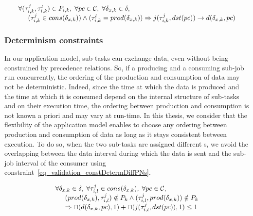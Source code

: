 \documentclass[main.tex]{subfiles}
\begin{document}
\begin{equation}
    \label{eq_validation_constBwDataPrec}
    \begin{array}{l}
        \forall (\tau_{i,k}^j , \tau_{i,k}^l) \in P_{i,k}, \; \forall pc \in \mathcal{C} , \; \forall \delta_{x,k} \in \delta , \;  \\
        \hspace{5mm} (\tau_{i,k}^j \in cons(\delta_{x,k})) \land (\tau_{i,k}^l = prod(\delta_{x,k}))
        \Rightarrow j(\tau_{i,k}^j , dst(pc)) \to d( \delta_{x,k} , pc )  
    \end{array}
\end{equation}


\subsubsection{Determinism constraints}
In our application model, sub-tasks can exchange data, even without being
constrained by precedence relations. So, if a producing and a consuming sub-job
run concurrently, the ordering of the production and consumption of data may
not be deterministic. Indeed, since the time at which the data is produced and
the time at which it is consumed depend on the internal structure of sub-tasks
and on their execution time, the ordering between production and consumption is
not known a priori and may vary at run-time. In this thesis, we consider that
the flexibility of the application model enables to choose any ordering between
production and consumption of data as long as it stays consistent between
execution. To do so, when the two sub-tasks are assigned different \PN{}s, we
avoid the overlapping between the data interval during which the data is sent
and the sub-job interval of the consumer using
constraint~\ref{eq_validation_constDetermDiffPNs}.

\begin{equation}
    \label{eq_validation_constDetermDiffPNs}
    \begin{array}{l}
        \forall \delta_{x,k} \in \delta ,\; \forall \tau_{i,l}^j \in cons( \delta_{x,k} ), \; \forall pc \in \mathcal{C}, \\
        \hspace{5mm} ( prod(\delta_{x,k}), \tau_{i,l}^j ) \notin P_k \land (\tau_{i,l}^j, prod(\delta_{x,k})) \notin P_k \\
        \hspace{5mm} \Rightarrow \sqcap ( d(\delta_{x,k}, pc) ,1) + \sqcap ( j(\tau_{i,l}^j, dst(pc)) ,1) \leq 1
    \end{array}
\end{equation}
\end{document}

